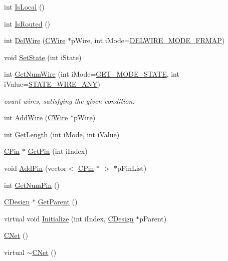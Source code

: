 \begin{DoxyCompactItemize}
\item 
int \mbox{\hyperlink{classCNet_a2d8665848d2b21b355753866f872af45}{Is\+Local}} ()
\item 
int \mbox{\hyperlink{classCNet_a0c25ee386b4a476bee6a6d86da9959d9}{Is\+Routed}} ()
\item 
int \mbox{\hyperlink{classCNet_a26f0aadddc16f2e5ec33a3b2e5f4e97a}{Del\+Wire}} (\mbox{\hyperlink{classCWire}{C\+Wire}} $\ast$p\+Wire, int i\+Mode=\mbox{\hyperlink{BoxRouter_8h_a2675adf9c4b7c477e4a85507b9a1f23a}{D\+E\+L\+W\+I\+R\+E\+\_\+\+M\+O\+D\+E\+\_\+\+F\+R\+M\+AP}})
\item 
void \mbox{\hyperlink{classCNet_adecbdeeb33f6ef0a4f9cada16ffac585}{Set\+State}} (int i\+State)
\item 
int \mbox{\hyperlink{classCNet_ae194cdbb585414b5eb533d0d097944b3}{Get\+Num\+Wire}} (int i\+Mode=\mbox{\hyperlink{BoxRouter_8h_a6f72f2cc9dd31793dd832ccfb2547de4}{G\+E\+T\+\_\+\+M\+O\+D\+E\+\_\+\+S\+T\+A\+TE}}, int i\+Value=\mbox{\hyperlink{BoxRouter_8h_a1b285251edd87e1423189470586cc719}{S\+T\+A\+T\+E\+\_\+\+W\+I\+R\+E\+\_\+\+A\+NY}})
\begin{DoxyCompactList}\small\item\em count wires, satisfying the given condition. \end{DoxyCompactList}\item 
int \mbox{\hyperlink{classCNet_a95e5735a7449f7d54fe97c335a65fccc}{Add\+Wire}} (\mbox{\hyperlink{classCWire}{C\+Wire}} $\ast$p\+Wire)
\item 
int \mbox{\hyperlink{classCNet_a8712e8f595e036e1e5c693100d071e38}{Get\+Length}} (int i\+Mode, int i\+Value)
\item 
\mbox{\hyperlink{classCPin}{C\+Pin}} $\ast$ \mbox{\hyperlink{classCNet_afa01af65ac2f23050bab801b844034ce}{Get\+Pin}} (int i\+Index)
\item 
void \mbox{\hyperlink{classCNet_a6fbe191b6e69b29fb54d409779caf776}{Add\+Pin}} (vector$<$ \mbox{\hyperlink{classCPin}{C\+Pin}} $\ast$ $>$ $\ast$p\+Pin\+List)
\item 
int \mbox{\hyperlink{classCNet_a709f7e9718fa62118a55d8def2fd4e41}{Get\+Num\+Pin}} ()
\item 
\mbox{\hyperlink{classCDesign}{C\+Design}} $\ast$ \mbox{\hyperlink{classCNet_a920188d5e3abdca198ad85d4299ea10d}{Get\+Parent}} ()
\item 
virtual void \mbox{\hyperlink{classCNet_aa9584e96f1e2aa7701ec11f40686db23}{Initialize}} (int i\+Index, \mbox{\hyperlink{classCDesign}{C\+Design}} $\ast$p\+Parent)
\item 
\mbox{\hyperlink{classCNet_aafe21b654acdaa4118d359766dc30d18}{C\+Net}} ()
\item 
virtual \mbox{\hyperlink{classCNet_a7cca1940642bf76e663685f011f20067}{$\sim$\+C\+Net}} ()
\end{DoxyCompactItemize}
